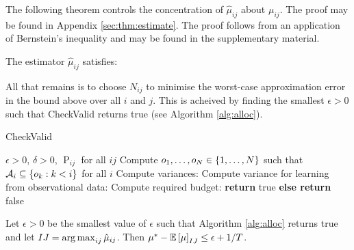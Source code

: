 The following theorem controls the concentration of $\hat \mu_{ij}$ about $\mu_{ij}$. 
\ifsup
The proof may be found in Appendix \ref{sec:thm:estimate}.
\else
The proof follows from an application of Bernstein's inequality and may be found in the supplementary material.
\fi

\begin{theorem}\label{thm:estimate}
The estimator $\hat \mu_{ij}$ satisfies:
\end{theorem}


All that remains is to choose $N_{ij}$ to minimise the worst-case approximation error in the bound above over all $i$ and $j$.
This is acheived by finding the smallest $\epsilon > 0$ such that {\sc CheckValid} returns true (see Algorithm \ref{alg:alloc}).


\begin{algorithm}[H]
\caption{CheckValid}\label{alg:alloc}
\begin{algorithmic}
 $\epsilon > 0$, $\delta > 0$, $\operatorname P_{ij}$ for all $ij$
\STATE Compute $o_1,\ldots,o_N \in \left\{1,\ldots,N\right\}$ such that $\mathcal A_i \subseteq \left\{o_k : k < i\right\}$ for all $i$
\STATE Compute variances:
\STATE Compute variance for learning from observational data:
\STATE Compute required budget: 
\ENDFOR
{} {\bf return} true {\bf else return} false
\end{algorithmic}
\end{algorithm}

\begin{theorem}
Let $\epsilon > 0$ be the smallest value of $\epsilon$ such that Algorithm \ref{alg:alloc} returns true and let $IJ = \argmax_{ij} \hat \mu_{ij}$.
Then $\mu^* - \mathbb E\left[\mu\right]_{IJ} \leq \epsilon + 1/T$.
\end{theorem}


